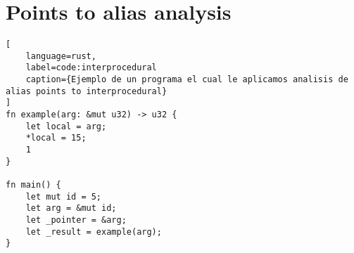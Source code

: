 \section{Points to alias analysis}

\begin{lstlisting}[
    language=rust,
    label=code:interprocedural
    caption={Ejemplo de un programa el cual le aplicamos analisis de alias points to interprocedural}
]
fn example(arg: &mut u32) -> u32 {
    let local = arg;
    *local = 15;
    1
}

fn main() {
    let mut id = 5;
    let arg = &mut id;
    let _pointer = &arg;
    let _result = example(arg);
}
\end{lstlisting}





